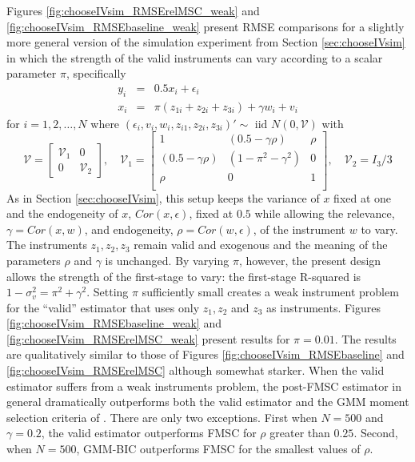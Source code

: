 Figures \ref{fig:chooseIVsim_RMSErelMSC_weak} and \ref{fig:chooseIVsim_RMSEbaseline_weak} present RMSE comparisons for a slightly more general version of the simulation experiment from Section \ref{sec:chooseIVsim} in which the strength of the valid instruments can vary according to a scalar parameter $\pi$, specifically
\begin{eqnarray}
		y_i &=& 0.5 x_i + \epsilon_i\\ 
		\label{eq:chooseIVDGP1_weak}
		x_i &=& \pi (z_{1i} + z_{2i} + z_{3i}) + \gamma w_i + v_i 
		\label{eq:chooseIVDGP2_weak}
	\end{eqnarray}
for $i=1, 2, \hdots, N$ where $(\epsilon_i, v_i, w_i, z_{i1}, z_{2i}, z_{3i})' \sim \mbox{ iid  } N(0,\mathcal{V})$ with
\begin{equation}	
	\mathcal{V} = \left[  \begin{array}
		{cc} \mathcal{V}_1 & 0 \\ 0 & \mathcal{V}_2
	\end{array}\right], \quad
	\mathcal{V}_1 = \left[ \begin{array}
		{ccc} 
		1 & (0.5 - \gamma \rho) & \rho \\
		(0.5 - \gamma \rho) & (1 - \pi^2 - \gamma^2) & 0\\ 
		\rho & 0 & 1 \\ 
	\end{array} \right], \quad \mathcal{V}_2 = I_3 / 3
	\label{eq:chooseIVDGP3_weak}
\end{equation}
As in Section \ref{sec:chooseIVsim}, this setup keeps the variance of $x$ fixed at one and the endogeneity of $x$, $Cor(x, \epsilon)$, fixed at $0.5$ while allowing the relevance, $\gamma = Cor(x,w)$, and endogeneity, $\rho = Cor(w, \epsilon)$, of the instrument $w$ to vary.
The instruments $z_1, z_2, z_3$ remain valid and exogenous and the meaning of the parameters $\rho$ and $\gamma$ is unchanged.
By varying $\pi$, however, the present design allows the strength of the first-stage to vary: the first-stage R-squared is $1 - \sigma_v^2 = \pi^2 + \gamma^2$.
Setting $\pi$ sufficiently small creates a weak instrument problem for the ``valid'' estimator that uses only $z_1, z_2$ and $z_3$ as instruments.
Figures \ref{fig:chooseIVsim_RMSEbaseline_weak} and \ref{fig:chooseIVsim_RMSErelMSC_weak} present results for $\pi = 0.01$.
The results are qualitatively similar to those of Figures \ref{fig:chooseIVsim_RMSEbaseline} and \ref{fig:chooseIVsim_RMSErelMSC} although somewhat starker.
When the valid estimator suffers from a weak instruments problem, the post-FMSC estimator in general dramatically outperforms both the valid estimator and the GMM moment selection criteria of \cite{Andrews1999}.
There are only two exceptions. 
First when $N = 500$ and $\gamma = 0.2$, the valid estimator outperforms FMSC for $\rho$ greater than $0.25$.
Second, when $N = 500$, GMM-BIC outperforms FMSC for the smallest values of $\rho$.

